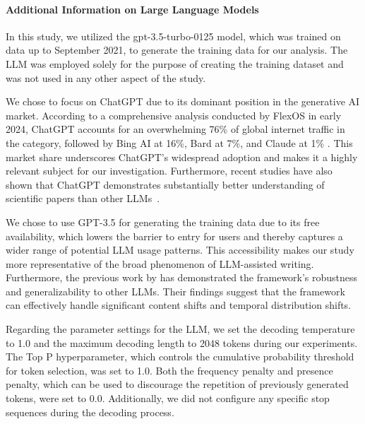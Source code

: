 \documentclass{article}
\begin{document}
\paragraph{Additional Information on Large Language Models}

In this study, we utilized the gpt-3.5-turbo-0125 model, which was trained on data up to September 2021, to generate the training data for our analysis. The LLM was employed solely for the purpose of creating the training dataset and was not used in any other aspect of the study.

We chose to focus on ChatGPT due to its dominant position in the generative AI market. According to a comprehensive analysis conducted by FlexOS in early 2024, ChatGPT accounts for an overwhelming 76\% of global internet traffic in the category, followed by Bing AI at 16\%, Bard at 7\%, and Claude at 1\% \citep{vanrossum2024generative}. This market share underscores ChatGPT's widespread adoption and makes it a highly relevant subject for our investigation. Furthermore, recent studies have also shown that ChatGPT demonstrates substantially better understanding of scientific papers than other LLMs~\citep{liang2023can,liu2023reviewergpt}.




We chose to use GPT-3.5 for generating the training data due to its free availability, which lowers the barrier to entry for users and thereby captures a wider range of potential LLM usage patterns. This accessibility makes our study more representative of the broad phenomenon of LLM-assisted writing. 
Furthermore, the previous work by \citet{liang2024monitoring} has demonstrated the framework's robustness and generalizability to other LLMs. Their findings suggest that the framework can effectively handle significant content shifts and temporal distribution shifts. 


Regarding the parameter settings for the LLM, we set the decoding temperature to 1.0 and the maximum decoding length to 2048 tokens during our experiments. The Top P hyperparameter, which controls the cumulative probability threshold for token selection, was set to 1.0. Both the frequency penalty and presence penalty, which can be used to discourage the repetition of previously generated tokens, were set to 0.0. Additionally, we did not configure any specific stop sequences during the decoding process.






\newpage 
\clearpage
\end{document}
